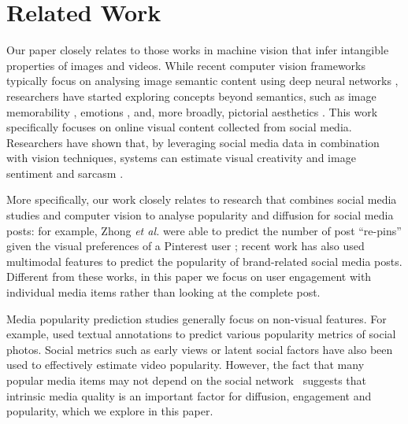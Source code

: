 \section{ Related Work}
Our paper closely relates to those works  in machine vision that infer intangible properties of images and videos. While recent computer vision frameworks typically focus on analysing image semantic content using deep neural networks \cite{krizhevsky2012imagenet}, researchers have started exploring concepts beyond semantics, such as image memorability \cite{isola2011makes}, emotions \cite{Machajdik}, and, more broadly, pictorial aesthetics \cite{datta2008algorithmic,luo2008photo, goodSelfie}. 
This work specifically focuses on online visual content collected from social media. Researchers have shown that, by leveraging social media data in combination with vision techniques, systems can estimate visual creativity \cite{redi20146} and image sentiment \cite{wang2015inferring,jou2015visual} and sarcasm \cite{schifanella2016detecting}. %

More specifically, our work closely relates to research that combines social media studies and computer vision to analyse popularity and diffusion for social media posts: for example, Zhong \textsl{et al.} were able to predict the number of post ``re-pins''  given the visual preferences of a Pinterest user \cite{predictingPintrest}; recent work \cite{Mazloom:2016:MPP:2964284.2967210} has also used multimodal features to predict the popularity of brand-related social media posts. Different from these works, in this paper we focus on user engagement with individual media items rather than looking at the complete post. 

Media popularity prediction studies generally focus on non-visual features.  For example, \cite{Yamasaki:2014} used textual annotations to predict various popularity metrics of social photos. Social metrics such as early views \cite{pinto2013using} or latent social factors \cite{nwana2013latent} have also been used to effectively estimate video popularity. However, the fact that many popular media items may not depend on the social  network~\cite{Cha2009Flickr} suggests that intrinsic media quality is an important factor for diffusion, engagement and popularity, which we explore in this paper.
 
